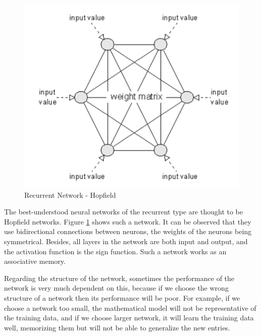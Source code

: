 \begin{figure}[htbp]
	\centerline{\includegraphics[scale=0.75]{fig/reatea-recurenta.png}}  
  \caption{Recurrent Network - Hopfield  \cite{book.neuronal.network.1995}}
  \label{fig:hopfield}
  
\end{figure}

\par The best-understood neural networks of the recurrent type are thought to be Hopfield networks.
 Figure \ref{fig:hopfield} shows such a network. It can be observed that they use bidirectional connections between neurons, 
 the weights of the neurons being symmetrical. Besides, all layers in the network are both input and output, and the activation function is the sign function. 
Such a network works as an associative memory.

Regarding the structure of the network, sometimes the performance of the network is very much dependent on this, 
because if we choose the wrong structure of a network then its performance will be poor. For example, if we choose a network too small, 
the mathematical model will not be representative of the training data,
 and if we choose larger network, it will learn the training data well, memorizing them but will not be able to generalize the new entries. \cite{book.neuronal.network.1995}


